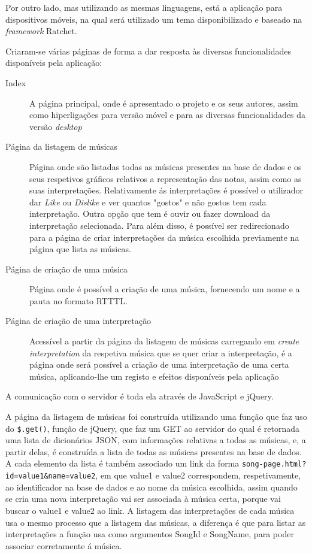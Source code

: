 \documentclass[a4paper,11pt,openright,oneside]{report}
\begin{document}
Por outro lado, mas utilizando as mesmas linguagens, está a aplicação para dispositivos móveis, na qual será utilizado um tema disponibilizado e baseado na \textit{framework} Ratchet.

Criaram-se várias páginas de forma a dar resposta às diversas funcionalidades disponíveis pela aplicação:

\begin{description}
\item[Index]
A página principal, onde é apresentado o projeto e os seus autores, assim como hiperligações para versão móvel e para as diversas funcionalidades da versão \textit{desktop}
\item[Página da listagem de músicas]
Página onde são listadas todas as músicas presentes na base de dados e os seus respetivos gráficos relativos a representação das notas, assim como as suas interpretações. Relativamente ás interpretações é possível o utilizador dar \textit{Like} ou \textit{Dislike} e ver quantos "gostos" e não gostos tem cada interpretação. Outra opção que tem é ouvir ou fazer download da interpretação selecionada. Para além disso, é possível ser redirecionado para a página de criar interpretações da música escolhida previamente na página que lista as músicas. 
\item[Página de criação de uma música]
Página onde é possível a criação de uma música, fornecendo um nome e a pauta no formato RTTTL.
\item[Página de criação de uma interpretação]
Acessível a partir da página da listagem de músicas carregando em \textit{create interpretation} da respetiva música que se quer criar a interpretação, é a página onde será possível a criação de uma interpretação de uma certa música, aplicando-lhe um registo e efeitos disponíveis pela aplicação
\end{description}

A comunicação com o servidor é toda ela através de JavaScript e jQuery.

A página da listagem de músicas foi construída utilizando uma função que faz uso do \texttt{\$.get()}, função de jQuery, que faz um GET ao servidor do qual é retornada uma lista de dicionários JSON, com informações relativas a todas as músicas, e, a partir delas, é construída a lista de todas as músicas presentes na base de dados. A cada elemento da lista é também associado um link da forma \texttt{song-page.html?id=value1\&name=value2}, em que value1 e value2 correspondem, respetivamente, ao identificador na base de dados e ao nome da música escolhida, assim quando se cria uma nova interpretação vai ser associada à música certa, porque vai buscar o value1 e value2 ao link. A listagem das interpretações de cada música usa o mesmo processo que a listagem das músicas, a diferença é que para listar as interpretações a função usa como argumentos SongId e SongName, para poder associar corretamente á música.
\end{document}
